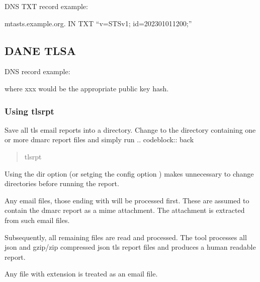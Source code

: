 \documentclass[letterpaper,10pt,english]{sphinxmanual}
\begin{document}
\sphinxAtStartPar
DNS TXT record example:

\begin{sphinxVerbatim}[commandchars=\\\{\}]
\PYGZus{}mta\PYGZhy{}sts.example.org.  IN TXT “v=STSv1; id=202301011200;”
\end{sphinxVerbatim}


\subsection{DANE TLSA}
\label{\detokenize{Readme-TLS:dane-tlsa}}
\sphinxAtStartPar
DNS record example:

\begin{sphinxVerbatim}[commandchars=\\\{\}]
     
\end{sphinxVerbatim}

\sphinxAtStartPar
where xxx would be the appropriate public key hash.


\subsubsection{Using tls\sphinxhyphen{}rpt}
\label{\detokenize{Readme-TLS:using-tls-rpt}}
\sphinxAtStartPar
Save all tls email reports into a directory.
Change to the directory containing one or more dmarc report files and simply run
.. code\sphinxhyphen{}block:: back
\begin{quote}

\sphinxAtStartPar
tls\sphinxhyphen{}rpt
\end{quote}

\sphinxAtStartPar
Using the \textendash{}dir option (or setging the config option ) makes unnecessary to change directories before
running the report.

\sphinxAtStartPar
Any email files, those ending with  will be processed first. These are assumed to
contain the dmarc report as a mime attachment. The attachment is extracted from such email
files.

\sphinxAtStartPar
Subsequently, all remaining files are read and processed. The tool processes all json
and gzip/zip compressed json tls report files and produces a human readable report.

\sphinxAtStartPar
Any file with extension  is treated as an email file.
\end{document}
